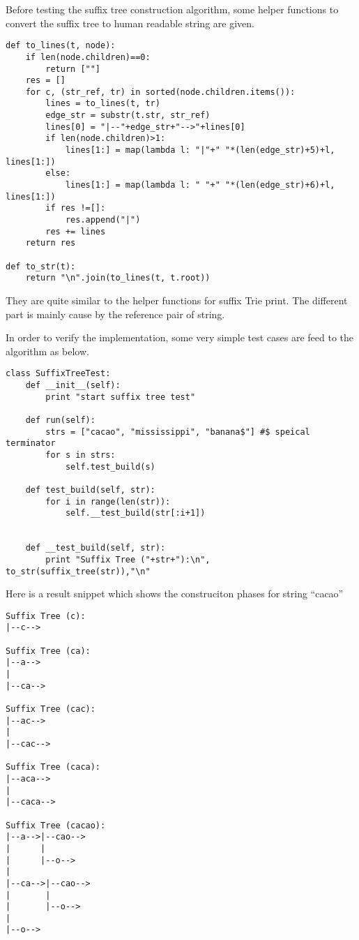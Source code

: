 \documentclass{article}
\begin{document}
Before testing the suffix tree construction algorithm, some helper
functions to convert the suffix tree to human readable string are
given.

\begin{lstlisting}
def to_lines(t, node):
    if len(node.children)==0:
        return [""]
    res = []
    for c, (str_ref, tr) in sorted(node.children.items()):
        lines = to_lines(t, tr)
        edge_str = substr(t.str, str_ref)
        lines[0] = "|--"+edge_str+"-->"+lines[0]
        if len(node.children)>1:
            lines[1:] = map(lambda l: "|"+" "*(len(edge_str)+5)+l, lines[1:])
        else:
            lines[1:] = map(lambda l: " "+" "*(len(edge_str)+6)+l, lines[1:])
        if res !=[]:
            res.append("|")
        res += lines
    return res

def to_str(t):
    return "\n".join(to_lines(t, t.root))
\end{lstlisting}

They are quite similar to the helper functions for suffix Trie print. The different
part is mainly cause by the reference pair of string.

In order to verify the implementation, some very simple test cases are feed to the
algorithm as below.

\begin{lstlisting}
class SuffixTreeTest:
    def __init__(self):
        print "start suffix tree test"

    def run(self):
        strs = ["cacao", "mississippi", "banana$"] #$ speical terminator
        for s in strs:
            self.test_build(s)

    def test_build(self, str):
        for i in range(len(str)):
            self.__test_build(str[:i+1])


    def __test_build(self, str):
        print "Suffix Tree ("+str+"):\n", to_str(suffix_tree(str)),"\n"
\end{lstlisting}

Here is a result snippet which shows the construciton phases for string ``cacao''

\begin{verbatim}
Suffix Tree (c):
|--c--> 

Suffix Tree (ca):
|--a-->
|
|--ca--> 

Suffix Tree (cac):
|--ac-->
|
|--cac--> 

Suffix Tree (caca):
|--aca-->
|
|--caca--> 

Suffix Tree (cacao):
|--a-->|--cao-->
|      |
|      |--o-->
|
|--ca-->|--cao-->
|       |
|       |--o-->
|
|--o--> 
\end{verbatim}
\end{document}
